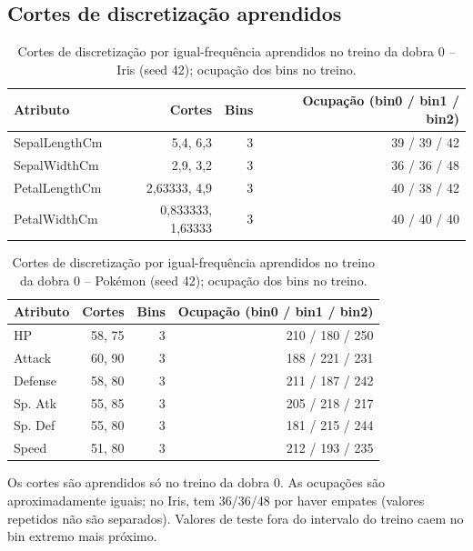\documentclass[a4paper,11pt]{article}
\newcommand{\code}[1]{\texttt{\detokenize{#1}}}
\begin{document}
\subsection{Cortes de discretiza\c{c}\~ao aprendidos}
\begin{table}[htbp]
\centering
\small
\caption{Cortes de discretização por igual-frequência aprendidos no treino da dobra 0 -- Iris (seed 42); ocupação dos bins no treino.}
\label{tab:cortes_iris}
\begin{tabular}{lrrr}
\toprule
Atributo & Cortes & Bins & Ocupação (bin0 / bin1 / bin2) \\
\midrule
SepalLengthCm & 5,4, 6,3 & 3 & 39 / 39 / 42 \\
SepalWidthCm & 2,9, 3,2 & 3 & 36 / 36 / 48 \\
PetalLengthCm & 2,63333, 4,9 & 3 & 40 / 38 / 42 \\
PetalWidthCm & 0,833333, 1,63333 & 3 & 40 / 40 / 40 \\
\bottomrule
\end{tabular}
\end{table}

\begin{table}[htbp]
\centering
\small
\caption{Cortes de discretização por igual-frequência aprendidos no treino da dobra 0 -- Pokémon (seed 42); ocupação dos bins no treino.}
\label{tab:cortes_pokemon}
\begin{tabular}{lrrr}
\toprule
Atributo & Cortes & Bins & Ocupação (bin0 / bin1 / bin2) \\
\midrule
HP & 58, 75 & 3 & 210 / 180 / 250 \\
Attack & 60, 90 & 3 & 188 / 221 / 231 \\
Defense & 58, 80 & 3 & 211 / 187 / 242 \\
Sp. Atk & 55, 85 & 3 & 205 / 218 / 217 \\
Sp. Def & 55, 80 & 3 & 181 / 215 / 244 \\
Speed & 51, 80 & 3 & 212 / 193 / 235 \\
\bottomrule
\end{tabular}
\end{table}

Os cortes s\~ao aprendidos s\'o no treino da dobra 0. As ocupa\c{c}\~oes s\~ao aproximadamente iguais; no Iris, \code{SepalWidthCm} tem 36/36/48 por haver empates (valores repetidos n\~ao s\~ao separados). Valores de teste fora do intervalo do treino caem no bin extremo mais pr\'oximo.
\end{document}
